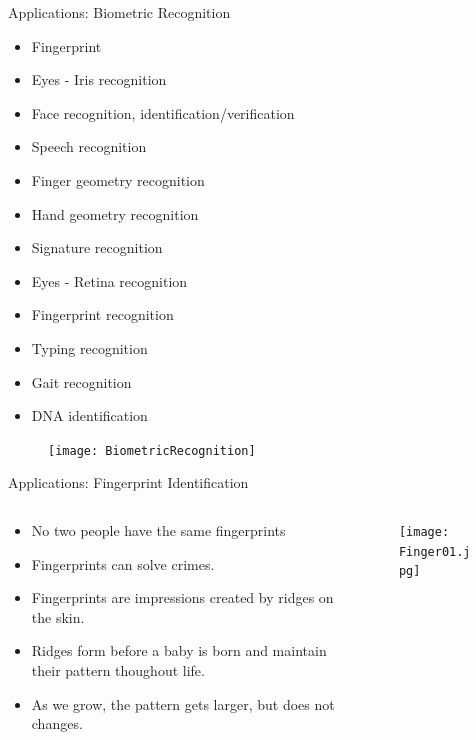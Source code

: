 \begin{frame}{Applications: Biometric Recognition}
\vspace{-6pt}
\begin{multicols}{2}
\begin{itemize}
\item Fingerprint
\item Eyes - Iris recognition
\item Face recognition, identification/verification
\item Speech recognition
\item Finger geometry recognition
\item Hand geometry recognition
\item Signature recognition
\item Eyes - Retina recognition
\item Fingerprint recognition
\item Typing recognition
\item Gait recognition
\item DNA identification
\end{itemize}
\end{multicols}
\begin{figure}
\texttt{[image: BiometricRecognition]}
\end{figure}
\end{frame}

\begin{frame}{Applications: Fingerprint Identification}
\begin{columns}
\begin{column}{6cm}
\begin{itemize}
\item No two people have the same fingerprints
\item Fingerprints can solve crimes.
\item Fingerprints are impressions created by ridges on the skin.
\item Ridges form before a baby is born and maintain their pattern thoughout life.
\item As we grow, the pattern gets larger, but does not changes.
\end{itemize}
\end{column}
\begin{column}{5cm}
\begin{figure}
\texttt{[image: Finger01.jpg]}
\end{figure}
\end{column}
\end{columns}
\end{frame}

